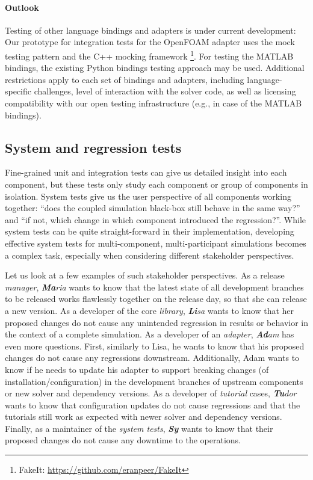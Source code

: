 \paragraph{Outlook} Testing of other language bindings and adapters is under current development: Our prototype for integration tests for the OpenFOAM adapter uses the mock testing pattern and the C++ mocking framework \footnote{FakeIt: \url{https://github.com/eranpeer/FakeIt}}. For testing the MATLAB bindings, the existing Python bindings testing approach may be used. Additional restrictions apply to each set of bindings and adapters, including language-specific challenges, level of interaction with the solver code, as well as licensing compatibility with our open testing infrastructure (e.g., in case of the MATLAB bindings).

\subsection{System and regression tests}
\label{ssec:system_tests} 

Fine-grained unit and integration tests can give us detailed insight into each component, but these tests only study each component or group of components in isolation.
System tests give us the user perspective of all components working together: ``does the coupled simulation black-box still behave in the same way?'' and ``if not, which change in which component introduced the regression?''.
While system tests can be quite straight-forward in their implementation, developing effective system tests for multi-component, multi-participant
simulations becomes a complex task, especially when considering different stakeholder perspectives.

Let us look at a few examples of such stakeholder perspectives. As a release \textit{manager}, \textit{\textbf{Ma}ria} wants to know that the latest state of all development branches to be released works flawlessly together on the release day, so that she can release a new version.
As a developer of the core \textit{library}, \textit{\textbf{Li}sa} wants to know that her proposed changes do not cause any unintended regression in results or behavior in the context of a complete simulation.
As a developer of an \textit{adapter}, \textit{\textbf{Ad}am} has even more questions. First, similarly to Lisa, he wants to know that his proposed changes do not cause any regressions downstream. Additionally, Adam wants to know if he needs to update his adapter to support breaking changes (of installation/configuration) in the development branches of upstream components or new solver and dependency versions.
As a developer of \textit{tutorial} cases, \textit{\textbf{Tu}dor} wants to know that configuration updates do not cause regressions and that the tutorials still work as expected with newer solver and dependency versions.
Finally, as a maintainer of the \textit{system tests}, \textit{\textbf{Sy}} wants to know that their proposed changes do not cause any downtime to the operations.

